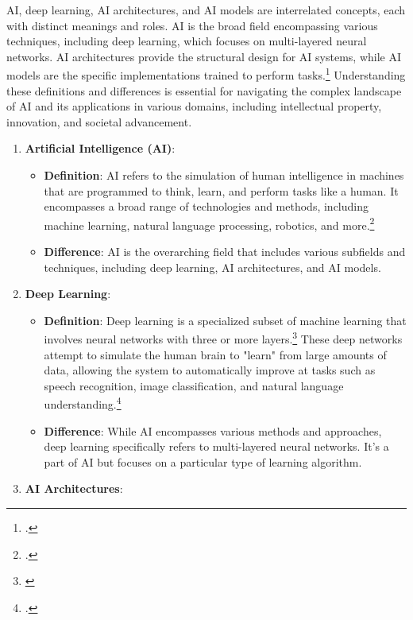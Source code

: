 \documentclass{article}[10pt]
\begin{document}
AI, deep learning, AI architectures, and AI models are interrelated concepts, each with distinct meanings and roles. 
AI is the broad field encompassing various techniques, including deep learning, which focuses on multi-layered neural networks. 
AI architectures provide the structural design for AI systems, while AI models are the specific implementations trained to perform tasks.\footnote{
    \cite{goodfellow2016deep}.}
Understanding these definitions and differences is essential for navigating the complex landscape of AI and its applications in various domains, including intellectual property, innovation, and societal advancement.

\begin{enumerate}
	\item \textbf{Artificial Intelligence (AI)}:
	\begin{itemize}
		\item \textbf{Definition}: 
        AI refers to the simulation of human intelligence in machines that are programmed to think, learn, and perform tasks like a human. 
        It encompasses a broad range of technologies and methods, including machine learning, natural language processing, robotics, and more.\footnote{
            \cite{russell2010artificial}.}
		\item \textbf{Difference}: 
        AI is the overarching field that includes various subfields and techniques, including deep learning, AI architectures, and AI models.
	\end{itemize}
	\item \textbf{Deep Learning}:
	\begin{itemize}
		\item \textbf{Definition}: 
        Deep learning is a specialized subset of machine learning that involves neural networks with three or more layers.\footnote{
            \cite{lecun2015deep}}
        These deep networks attempt to simulate the human brain to "learn" from large amounts of data, allowing the system to automatically improve at tasks such as speech recognition, image classification, and natural language understanding.\footnote{
            \cite{krizhevsky2012imagenet}.}
		\item \textbf{Difference}: 
        While AI encompasses various methods and approaches, deep learning specifically refers to multi-layered neural networks. 
        It's a part of AI but focuses on a particular type of learning algorithm.
	\end{itemize}
	\item \textbf{AI Architectures}:

\end{enumerate}
\end{document}
